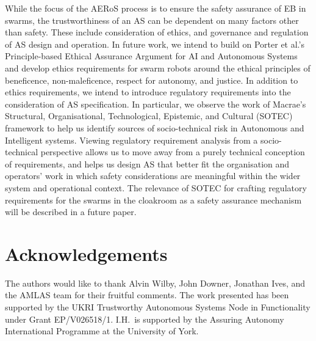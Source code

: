\documentclass{article}
\begin{document}
While the focus of the AERoS process is to ensure the safety assurance of EB in swarms, the trustworthiness of an AS can be dependent on many factors other than safety. These include consideration of ethics, and governance and regulation of AS design and operation. 
In future work, we intend to build on Porter et al.’s \cite{Porter2022} Principle-based Ethical Assurance Argument for AI and Autonomous Systems and develop ethics requirements for swarm robots around the ethical principles of beneficence, non-maleficence, respect for autonomy, and justice. 
In addition to ethics requirements, we intend to introduce regulatory requirements into the consideration of AS specification. In particular, we observe the work of Macrae’s~\cite{macrae2021learning} Structural, Organisational, Technological, Epistemic, and Cultural (SOTEC) framework to help us identify sources of socio-technical risk in Autonomous and Intelligent systems. Viewing regulatory requirement analysis from a socio-technical perspective allows us to move away from a purely technical conception of requirements, and helps us design AS that better fit the organisation and operators’ work in which safety considerations are meaningful within the wider system and operational context. The relevance of SOTEC for crafting regulatory requirements for the swarms in the cloakroom as a safety assurance mechanism will be described in a future paper. 

\section*{Acknowledgements} 
The authors would like to thank Alvin Wilby, John Downer, Jonathan Ives, and the AMLAS team for their fruitful comments. The work presented has been supported by the UKRI Trustworthy Autonomous Systems Node in Functionality under Grant EP/V026518/1. I.H.\ is supported by the Assuring Autonomy International Programme at the University of York.

\newpage
  

\end{document}
